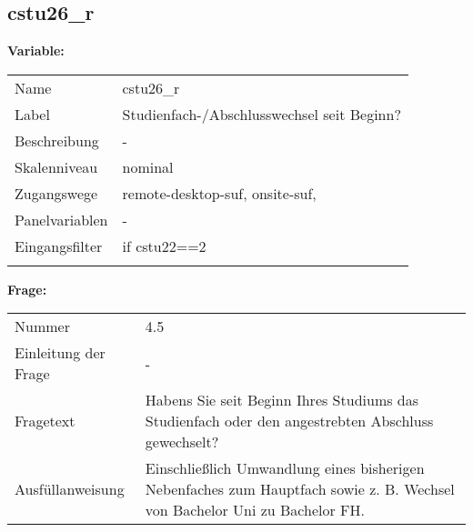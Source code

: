 	
	
	\subsection{cstu26\_r}
	\label{subSection:cstu26_r}

	\noindent\textbf{Variable:}\\
		\begin{tabular}{lL{11.3cm}}
			\label{tableVariable:cstu26_r}
			Name & cstu26\_r \\
			Label & Studienfach-/Abschlusswechsel seit Beginn? \\
			Beschreibung & - \\
			Skalenniveau & nominal \\
			Zugangswege &
				remote-desktop-suf,
				onsite-suf,
 \\
			Panelvariablen & -
			 \\
			Eingangsfilter & if cstu22==2 \\
 \\
		\end{tabular}

		\vspace*{1 cm}
		\noindent\textbf{Frage:}\\
		\begin{tabular}{lL{11.3cm}}
			\label{tableQuestion:cstu26_r}
			Nummer & 4.5 \\
			Einleitung der Frage & - \\
			Fragetext & Habens Sie seit Beginn Ihres Studiums das Studienfach oder den angestrebten Abschluss gewechselt? \\
			Ausfüllanweisung & Einschließlich Umwandlung eines bisherigen Nebenfaches zum Hauptfach sowie z. B. Wechsel von Bachelor Uni zu Bachelor FH. \\
		\end{tabular}





